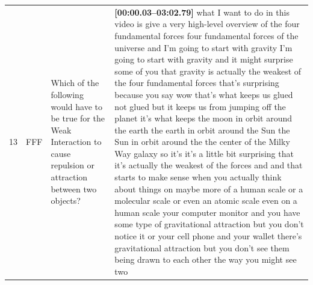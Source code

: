 \documentclass[10pt]{article}
\begin{document}
\begin{tiny}
\begin{longtable}{|r|p{0.375in}|p{1.275in}|p{3.5in}|}
13 &          FFF &                                                                                                                                                      Which of the following would have to be true for the Weak Interaction to cause repulsion or attraction between two objects? &                                                                                                                                                                                                                                                                                                                                                                                                                                                                                                                                                                                                                                                                                                                                                                                                                                                                                                                                                                                                                                                                                                                                                                                                                                                                                                                                                                                                                                                                                                                                                                                                                                                                                                                                                                                                                                                                                                                                                 \textbf{[00:00.03--03:02.79]} what I want to do in this video is give a very high-level overview of the four fundamental forces four fundamental forces of the universe and I'm going to start with gravity I'm going to start with gravity and it might surprise some of you that gravity is actually the weakest of the four fundamental forces that's surprising because you say wow that's what keeps us glued not glued but it keeps us from jumping off the planet it's what keeps the moon in orbit around the earth the earth in orbit around the Sun the Sun in orbit around the the center of the Milky Way galaxy so it's it's a little bit surprising that it's actually the weakest of the forces and and that starts to make sense when you actually think about things on maybe more of a human scale or a molecular scale or even an atomic scale even on a human scale your computer monitor and you have some type of gravitational attraction but you don't notice it or your cell phone and your wallet there's gravitational attraction but you don't see them being drawn to each other the way you might see two 
\end{longtable}
\end{tiny}
\end{document}
